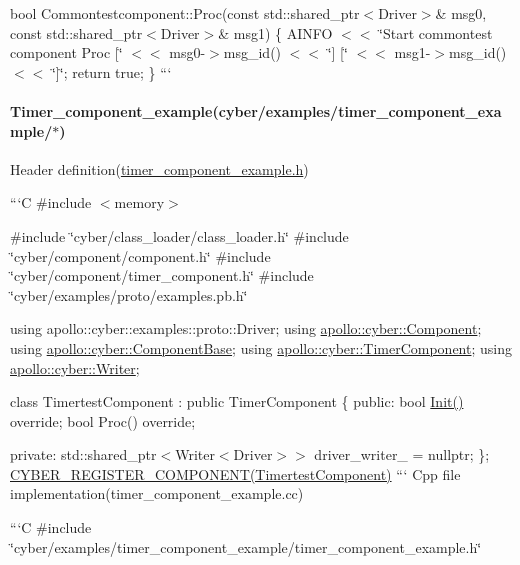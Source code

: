 {\ttfamily bool Commontestcomponent\-::\-Proc(const std\-::shared\-\_\-ptr$<$\-Driver$>$\& msg0, const std\-::shared\-\_\-ptr$<$\-Driver$>$\& msg1) \{ A\-I\-N\-F\-O $<$$<$ \char`\"{}\-Start commontest component Proc \mbox{[}\char`\"{} $<$$<$ msg0-\/$>$msg\-\_\-id() $<$$<$ \char`\"{}\mbox{]} \mbox{[}\char`\"{} $<$$<$ msg1-\/$>$msg\-\_\-id() $<$$<$ \char`\"{}\mbox{]}\char`\"{}; return true; \} ```}

{\ttfamily \paragraph*{Timer\-\_\-component\-\_\-example(cyber/examples/timer\-\_\-component\-\_\-example/$\ast$)}}

{\ttfamily }

{\ttfamily Header definition(\hyperlink{timer__component__example_8h}{timer\-\_\-component\-\_\-example.\-h})}

{\ttfamily ```\-C \#include $<$memory$>$}

{\ttfamily \#include \char`\"{}cyber/class\-\_\-loader/class\-\_\-loader.\-h\char`\"{} \#include \char`\"{}cyber/component/component.\-h\char`\"{} \#include \char`\"{}cyber/component/timer\-\_\-component.\-h\char`\"{} \#include \char`\"{}cyber/examples/proto/examples.\-pb.\-h\char`\"{}}

{\ttfamily using apollo\-::cyber\-::examples\-::proto\-::\-Driver; using \hyperlink{classapollo_1_1cyber_1_1Component}{apollo\-::cyber\-::\-Component}; using \hyperlink{classapollo_1_1cyber_1_1ComponentBase}{apollo\-::cyber\-::\-Component\-Base}; using \hyperlink{classapollo_1_1cyber_1_1TimerComponent}{apollo\-::cyber\-::\-Timer\-Component}; using \hyperlink{classapollo_1_1cyber_1_1Writer}{apollo\-::cyber\-::\-Writer};}

{\ttfamily class Timertest\-Component \-: public Timer\-Component \{ public\-: bool \hyperlink{namespaceapollo_1_1cyber_a2d055a81b338116634deaf8ac3367aca}{Init()} override; bool Proc() override;}

{\ttfamily  private\-: std\-::shared\-\_\-ptr$<$Writer$<$\-Driver$>$$>$ driver\-\_\-writer\-\_\- = nullptr; \}; \hyperlink{component_8h_a031103527dc7f59a627459d635de10f8}{C\-Y\-B\-E\-R\-\_\-\-R\-E\-G\-I\-S\-T\-E\-R\-\_\-\-C\-O\-M\-P\-O\-N\-E\-N\-T(\-Timertest\-Component)} ``` Cpp file implementation(timer\-\_\-component\-\_\-example.\-cc)}

{\ttfamily ```\-C \#include \char`\"{}cyber/examples/timer\-\_\-component\-\_\-example/timer\-\_\-component\-\_\-example.\-h\char`\"{}}

